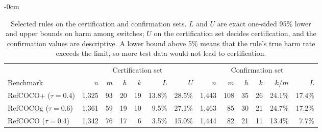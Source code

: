 \begin{table}[H]
\begin{adjustwidth}{-\extralength}{0cm}
\caption{Selected rules on the certification and confirmation sets.  $L$ and
$U$ are exact one-sided 95\% lower and upper bounds on harm among switches;
$U$ on the certification set decides certification, and the confirmation
values are descriptive.  A lower bound above 5\% means that the rule's true
harm rate exceeds the limit, so more test data would not lead to
certification.\label{tab:confirm}}
\centering
\small
\setlength{\tabcolsep}{4pt}
\begin{tabular}{@{}lrrrrrrrrrrrr@{}}
\toprule
& \multicolumn{6}{c}{Certification set} & \multicolumn{6}{c}{Confirmation set} \\
\cmidrule(lr){2-7}\cmidrule(l){8-13}
Benchmark & $n$ & $m$ & $h$ & $k$ & $L$ & $U$ & $n$ & $m$ & $h$ & $k$ & $k/m$ & $L$ \\
\midrule
RefCOCO+ ($\tau=0.4$) & 1{,}325 & 93 & 20 & 19 & 13.8\% & 28.5\% & 1{,}443 & 108 & 35 & 26 & 24.1\% & 17.4\% \\
RefCOCOg ($\tau=0.6$) & 1{,}361 & 59 & 19 & 10 & 9.5\% & 27.1\% & 1{,}463 & 85 & 30 & 21 & 24.7\% & 17.2\% \\
RefCOCO ($\tau=0.4$) & 1{,}342 & 76 & 17 & 6 & 3.5\% & 15.0\% & 1{,}444 & 82 & 21 & 11 & 13.4\% & 7.7\% \\
\bottomrule
\end{tabular}
\end{adjustwidth}
\end{table}
